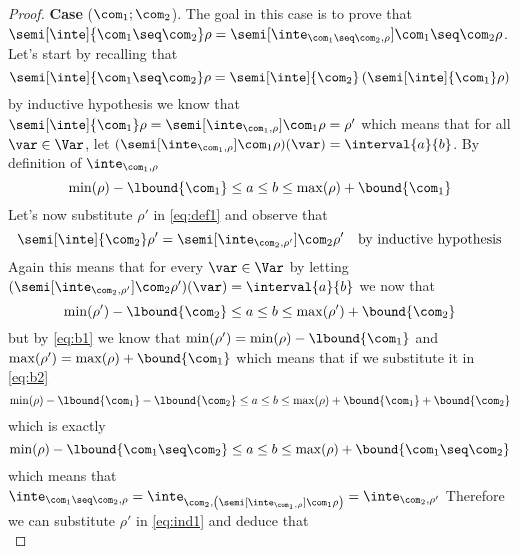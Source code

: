 \begin{proof}
  \noindent
  \textbf{Case} (\(\com_1 ; \com_2\)).
  The goal in this case is to prove that
  \({\semi[\inte]{\com_1 \seq \com_2}\rho} = {\semi[\inte_{\com_1 \seq
      \com_2, \rho}]{\com_1 \seq \com_2}\rho}\). Let's start by
  recalling that
  \begin{equation}\label{eq:def1}
    {\semi[\inte]{\com_1 \seq \com_2}\rho} = {\semi[\inte]{\com_2}\left(\semi[\inte]{\com_1}\rho\right)}
  \end{equation}
  by inductive hypothesis we know that
  \({\semi[\inte]{\com_1}\rho} = {\semi[\inte_{\com_1,
      \rho}]{\com_1}\rho} = \rho'\) which means that for all
  \(\var\in\Var\), let
  \({\left(\semi[\inte_{\com_1, \rho}]{\com_1}\rho\right)}(\var) =
  \interval{a}{b}\). By definition of \(\inte_{\com_1,\rho}\)
  \begin{equation}\label{eq:b1}
    \min(\rho) - \lbound{\com_1} \leq a \leq b \leq \max(\rho) + \bound{\com_1}
  \end{equation}
  Let's now substitute \(\rho'\) in \eqref{eq:def1} and observe that
  \begin{equation}\label{eq:ind1}
    \semi[\inte]{\com_2}\rho' = \semi[\inte_{\com_2, \rho'}]{\com_2}\rho' \quad \text{by inductive hypothesis}
  \end{equation}
  Again this means that for every \(\var \in \Var\) by letting
  \({\left(\semi[\inte_{\com_2, \rho'}]{\com_2}\rho'\right)}(\var) =
  \interval{a}{b}\) we now that
  \begin{equation}\label{eq:b2}
    \min(\rho') - \lbound{\com_2} \leq a \leq b \leq \max(\rho') + \bound{\com_2}
  \end{equation}
  but by \eqref{eq:b1} we know that
  \({\min(\rho') = \min(\rho) - \lbound{\com_1}}\) and
  \({\max(\rho') = \max(\rho) + \bound{\com_1}}\) which means that if
  we substitute it in \eqref{eq:b2}
  \begin{equation*}
    \min(\rho) - \lbound{\com_1} - \lbound{\com_2} \leq a \leq b \leq \max(\rho) + \bound{\com_1} + \bound{\com_2}
  \end{equation*}
  which is exactly
  \begin{equation*}
    \min(\rho) - \lbound{\com_1 \seq \com_2} \leq a \leq b \leq \max(\rho) + \bound{\com_1 \seq \com_2}
  \end{equation*}
  which means that
  \(\inte_{\com_1 \seq \com_2, \rho} = \inte_{\com_2,
    \left(\semi[\inte_{\com_1, \rho}]{\com_1}\rho\right)} =
  \inte_{\com_2, \rho'}\) Therefore we can substitute \(\rho'\) in
  \eqref{eq:ind1} and deduce that
  \begin{equation*}

\end{equation*}
\end{proof}
